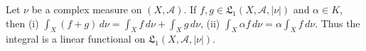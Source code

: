 Let $\nu$ be a complex measure on $(X, \mathcal{A})$. If $f, g \in \mathfrak{L}_1(X, \mathcal{A}, |\nu|)$ and $\alpha \in K$, then
(i) $\int_X (f + g) \, d\nu = \int_X f \, d\nu + \int_X g \, d\nu$,
(ii) $\int_X \alpha f \, d\nu = \alpha \int_X f \, d\nu$.
Thus the integral is a linear functional on $\mathfrak{L}_1(X, \mathcal{A}, |\nu|)$.
